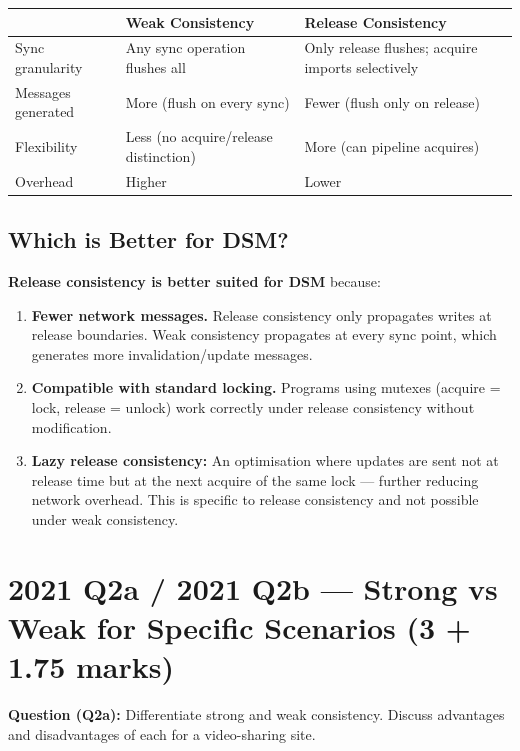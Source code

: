 \documentclass[12pt,a4paper]{article}
\begin{document}
\begin{center}
\begin{tabular}{@{}p{3.5cm}p{5cm}p{5cm}@{}}
\toprule
 & Weak Consistency & Release Consistency \\
\midrule
Sync granularity & Any sync operation flushes all & Only release flushes; acquire imports selectively \\
Messages generated & More (flush on every sync) & Fewer (flush only on release) \\
Flexibility & Less (no acquire/release distinction) & More (can pipeline acquires) \\
Overhead & Higher & Lower \\
\bottomrule
\end{tabular}
\end{center}

\subsection*{Which is Better for DSM?}

\textbf{Release consistency is better suited for DSM} because:
\begin{enumerate}[noitemsep]
  \item \textbf{Fewer network messages.} Release consistency only propagates writes at release boundaries. Weak consistency propagates at every sync point, which generates more invalidation/update messages.
  \item \textbf{Compatible with standard locking.} Programs using mutexes (acquire = lock, release = unlock) work correctly under release consistency without modification.
  \item \textbf{Lazy release consistency:} An optimisation where updates are sent not at release time but at the next acquire of the same lock --- further reducing network overhead. This is specific to release consistency and not possible under weak consistency.
\end{enumerate}

\section{2021 Q2a / 2021 Q2b --- Strong vs Weak for Specific Scenarios (3 + 1.75 marks)}

\textbf{Question (Q2a):} Differentiate strong and weak consistency. Discuss advantages and disadvantages of each for a video-sharing site.
\end{document}
